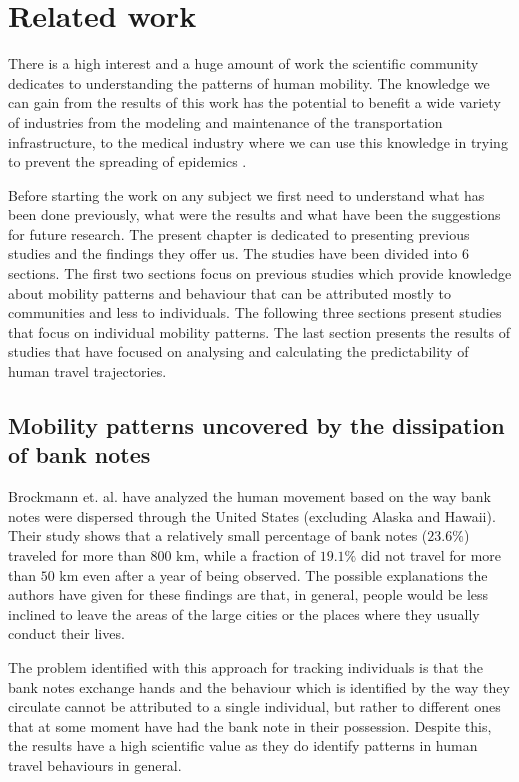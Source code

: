 \chapter{Related work}
\label{relatedwork}
There is a high interest and a huge amount of work the scientific community
dedicates to understanding the patterns of human mobility. The knowledge we can
gain from the results of this work has the potential to benefit a wide variety
of industries from the modeling and maintenance of the transportation
infrastructure, to the medical industry where we can use this knowledge in
trying to prevent the spreading of epidemics \cite{Brockmann08}.

Before starting the work on any subject we first need to understand what has
been done previously, what were the results and what have been the suggestions
for future research. The present chapter is dedicated to presenting previous
studies and the findings they offer us. The studies have been divided into $6$
sections. The first two sections focus on previous studies which provide
knowledge about mobility patterns and behaviour that can be attributed mostly to
communities and less to individuals. The following three sections present
studies that focus on individual mobility patterns. The last section presents
the results of studies that have focused on analysing and calculating the
predictability of human travel trajectories.

\section{Mobility patterns uncovered by the dissipation of bank notes}
Brockmann et. al.\cite{Brockmann06} have analyzed the human movement based on
the way bank notes were dispersed through the United States (excluding Alaska
and Hawaii). Their study shows that a relatively small percentage of bank notes
($23.6\%$) traveled for more than $800$ km, while a fraction of $19.1\%$ did not
travel for more than $50$ km even after a year of being observed. The possible
explanations the authors have given for these findings are that, in general,
people would be less inclined to leave the areas of the large cities or the
places where they usually conduct their lives.

The problem identified with this approach for tracking individuals is that the
bank notes exchange hands and the behaviour which is identified by the way they
circulate cannot be attributed to a single individual, but rather to different
ones that at some moment have had the bank note in their possession. Despite
this, the results have a high scientific value as they do identify patterns in
human travel behaviours in general.

